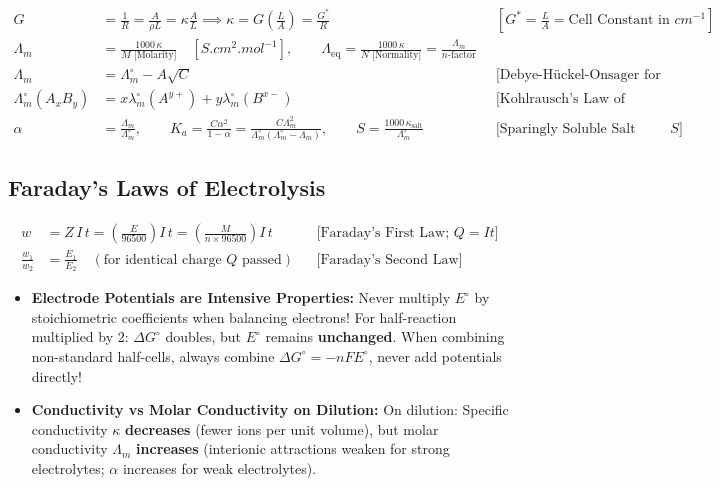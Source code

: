 \documentclass[11pt,a4paper]{article}
\begin{document}
\begin{formulabox}
\begin{align}
  G &= \frac{1}{R} = \frac{A}{\rho L} = \kappa\frac{A}{L} \implies \kappa = G\left(\frac{L}{A}\right) = \frac{G^*}{R} && [G^* = \frac{L}{A} = \text{Cell Constant in }\si{cm^{-1}}] \\
  \Lambda_m &= \frac{1000\,\kappa}{M\text{ [Molarity]}} \quad [\si{S.cm^2.mol^{-1}}], \qquad \Lambda_{\text{eq}} = \frac{1000\,\kappa}{N\text{ [Normality]}} = \frac{\Lambda_m}{n\text{-factor}} \\
  \Lambda_m &= \Lambda_m^\circ - A\sqrt{C} && \text{[Debye-H\"uckel-Onsager for Strong Electrolytes]} \\
  \Lambda_m^\circ(A_x B_y) &= x \lambda_m^\circ(A^{y+}) + y \lambda_m^\circ(B^{x-}) && \text{[Kohlrausch's Law of Independent Migration of Ions]} \\
  \alpha &= \frac{\Lambda_m}{\Lambda_m^\circ}, \qquad K_a = \frac{C \alpha^2}{1 - \alpha} = \frac{C \Lambda_m^2}{\Lambda_m^\circ(\Lambda_m^\circ - \Lambda_m)}, \qquad S = \frac{1000\,\kappa_{\text{salt}}}{\Lambda_m^\circ} && \text{[Sparingly Soluble Salt Solubility } S\text{]}
\end{align}
\end{formulabox}

\subsection{Faraday's Laws of Electrolysis}

\begin{formulabox}
\begin{align}
  w &= Z\,I\,t = \left(\frac{E}{96500}\right)I\,t = \left(\frac{M}{n \times 96500}\right)I\,t && \text{[Faraday's First Law; } Q = I t\text{]} \\
  \frac{w_1}{w_2} &= \frac{E_1}{E_2} \quad (\text{for identical charge } Q \text{ passed}) && \text{[Faraday's Second Law]}
\end{align}
\end{formulabox}

\begin{trapbox}
\begin{itemize}
  \item \textbf{Electrode Potentials are Intensive Properties:} Never multiply $E^\circ$ by stoichiometric coefficients when balancing electrons! For half-reaction multiplied by $2$: $\Delta G^\circ$ doubles, but $E^\circ$ remains \textbf{unchanged}. When combining non-standard half-cells, always combine $\Delta G^\circ = -nFE^\circ$, never add potentials directly!
  \item \textbf{Conductivity vs Molar Conductivity on Dilution:} On dilution: Specific conductivity $\kappa$ \textbf{decreases} (fewer ions per unit volume), but molar conductivity $\Lambda_m$ \textbf{increases} (interionic attractions weaken for strong electrolytes; $\alpha$ increases for weak electrolytes).
\end{itemize}
\end{trapbox}
\end{document}
